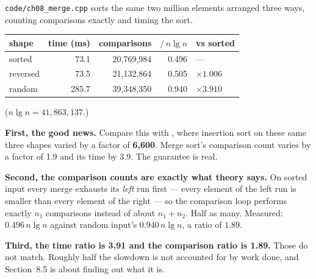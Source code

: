 \begin{worked}[Three Input Shapes, $n = 2{,}000{,}000$]
\texttt{code/ch08\_merge.cpp} sorts the same two million elements arranged
three ways, counting comparisons exactly and timing the sort.

\begin{center}
\begin{tabular}{@{}lrrrl@{}}
\toprule
\rowcolor{primary!15}
shape & time (ms) & comparisons & $/\,n\lg n$ & vs sorted \\
\midrule
sorted   &  73.1 & 20{,}769{,}984 & 0.496 & --- \\
reversed &  73.5 & 21{,}132{,}864 & 0.505 & $\times 1.006$ \\
random   & 285.7 & 39{,}348{,}350 & 0.940 & $\times 3.910$ \\
\bottomrule
\end{tabular}
\end{center}
($n \lg n = 41{,}863{,}137$.)

\smallskip
\textbf{First, the good news.} Compare this with , where insertion
sort on these same three shapes varied by a factor of \textbf{6{,}600}. Merge
sort's comparison count varies by a factor of 1.9 and its time by 3.9. The
guarantee is real.

\smallskip
\textbf{Second, the comparison counts are exactly what theory says.} On sorted
input every merge exhausts its \emph{left} run first --- every element of the
left run is smaller than every element of the right --- so the comparison loop
performs exactly $n_{1}$ comparisons instead of about $n_{1}+n_{2}$. Half as
many. Measured: $0.496\, n\lg n$ against random input's $0.940\,n\lg n$, a
ratio of $1.89$.

\smallskip
\textbf{Third, the time ratio is 3.91 and the comparison ratio is 1.89.} Those
do not match. Roughly half the slowdown is not accounted for by work done, and
Section~8.5 is about finding out what it is.
\end{worked}

